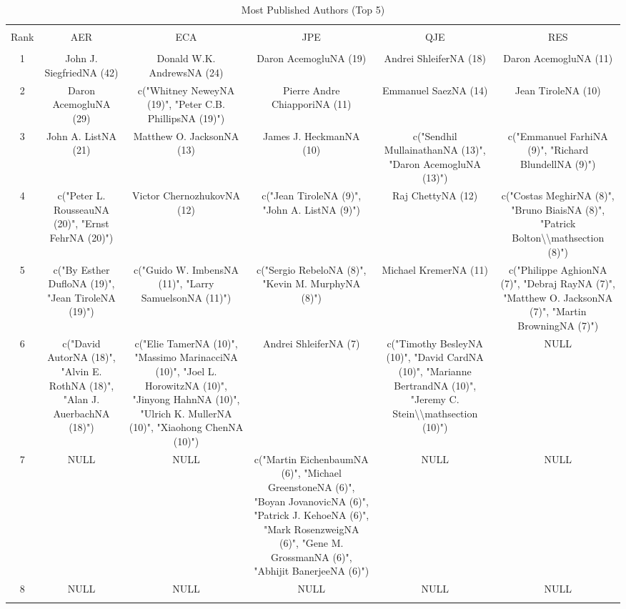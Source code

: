 
\begin{table}[!htbp] \centering 
  \caption{Most Published Authors (Top 5)} 
  \label{} 
\footnotesize 
\begin{tabular}{@{\extracolsep{5pt}} cccccc} 
\\[-1.8ex]\hline 
\hline \\[-1.8ex] 
Rank & AER & ECA & JPE & QJE & RES \\ 
\hline \\[-1.8ex] 
1 & John J. SiegfriedNA (42) & Donald W.K. AndrewsNA (24) & Daron AcemogluNA (19) & Andrei ShleiferNA (18) & Daron AcemogluNA (11) \\ 
2 & Daron AcemogluNA (29) & c("Whitney NeweyNA (19)", "Peter C.B. PhillipsNA (19)") & Pierre Andre ChiapporiNA (11) & Emmanuel SaezNA (14) & Jean TiroleNA (10) \\ 
3 & John A. ListNA (21) & Matthew O. JacksonNA (13) & James J. HeckmanNA (10) & c("Sendhil MullainathanNA (13)", "Daron AcemogluNA (13)") & c("Emmanuel FarhiNA (9)", "Richard BlundellNA (9)") \\ 
4 & c("Peter L. RousseauNA (20)", "Ernst FehrNA (20)") & Victor ChernozhukovNA (12) & c("Jean TiroleNA (9)", "John A. ListNA (9)") & Raj ChettyNA (12) & c("Costas MeghirNA (8)", "Bruno BiaisNA (8)", "Patrick Bolton\textbackslash \textbackslash mathsection (8)") \\ 
5 & c("By Esther DufloNA (19)", "Jean TiroleNA (19)") & c("Guido W. ImbensNA (11)", "Larry SamuelsonNA (11)") & c("Sergio RebeloNA (8)", "Kevin M. MurphyNA (8)") & Michael KremerNA (11) & c("Philippe AghionNA (7)", "Debraj RayNA (7)", "Matthew O. JacksonNA (7)", "Martin BrowningNA (7)") \\ 
6 & c("David AutorNA (18)", "Alvin E. RothNA (18)", "Alan J. AuerbachNA (18)") & c("Elie TamerNA (10)", "Massimo MarinacciNA (10)", "Joel L. HorowitzNA (10)", "Jinyong HahnNA (10)", "Ulrich K. MullerNA (10)", "Xiaohong ChenNA (10)") & Andrei ShleiferNA (7) & c("Timothy BesleyNA (10)", "David CardNA (10)", "Marianne BertrandNA (10)", "Jeremy C. Stein\textbackslash \textbackslash mathsection (10)") & NULL \\ 
7 & NULL & NULL & c("Martin EichenbaumNA (6)", "Michael GreenstoneNA (6)", "Boyan JovanovicNA (6)", "Patrick J. KehoeNA (6)", "Mark RosenzweigNA (6)", "Gene M. GrossmanNA (6)", "Abhijit BanerjeeNA (6)") & NULL & NULL \\ 
8 & NULL & NULL & NULL & NULL & NULL \\ 
\hline \\[-1.8ex] 
\end{tabular} 
\end{table} 
